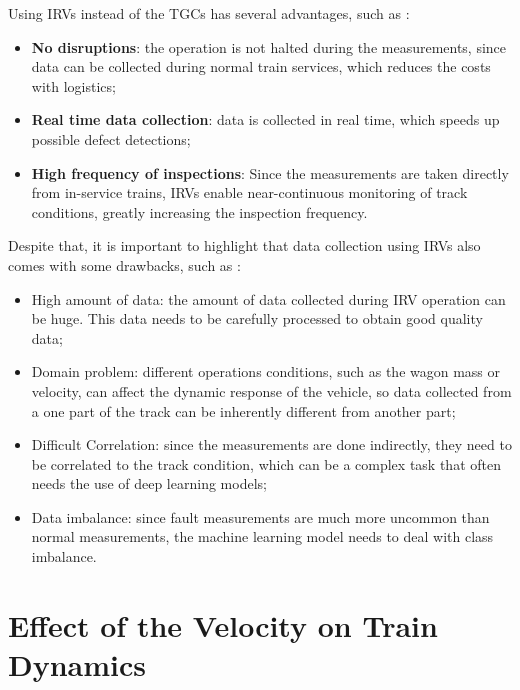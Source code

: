 Using IRVs instead of the TGCs has several advantages, such as \cite{PIRES2024107191,GHIASI2025109516,Hironori_ONO202322-00239}:
\begin{itemize}
    \item \textbf{No disruptions}: the operation is not halted during the measurements, since data can be collected during normal train services, which reduces the costs with logistics;
    \item \textbf{Real time data collection}: data is collected in real time, which speeds up possible defect detections;
    \item \textbf{High frequency of inspections}: Since the measurements are taken directly from in-service trains, IRVs enable near-continuous monitoring of track conditions, greatly increasing the inspection frequency.
\end{itemize}

Despite that, it is important to highlight that data collection using IRVs also comes with some drawbacks, such as \cite{PIRES2024107191,GHIASI2025109516}:
\begin{itemize}
    \item High amount of data: the amount of data collected during IRV operation can be huge. This data needs to be carefully processed to obtain good quality data;
    \item Domain problem: different operations conditions, such as the wagon mass or velocity, can affect the dynamic response of the vehicle, so data collected from a one part of the track can be inherently different from another part;
    \item Difficult Correlation: since the measurements are done indirectly, they need to be correlated to the track condition, which can be a complex task that often needs the use of deep learning models;
    \item Data imbalance: since fault measurements are much more uncommon than normal measurements, the machine learning model needs to deal with class imbalance.
\end{itemize}

\section{Effect of the Velocity on Train Dynamics} \label{sec-vel-effect-measurement}

